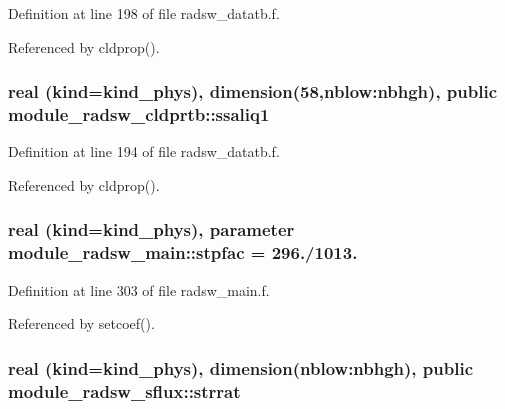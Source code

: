 Definition at line 198 of file radsw\+\_\+datatb.\+f.



Referenced by cldprop().

\subsubsection[{\texorpdfstring{ssaliq1}{ssaliq1}}]{\setlength{\rightskip}{0pt plus 5cm}real (kind=kind\+\_\+phys), dimension(58,nblow\+:nbhgh), public module\+\_\+radsw\+\_\+cldprtb\+::ssaliq1}\hypertarget{group__module__radsw__main_ga7944084ba9f240723dc93467ec66f825}{}\label{group__module__radsw__main_ga7944084ba9f240723dc93467ec66f825}


Definition at line 194 of file radsw\+\_\+datatb.\+f.



Referenced by cldprop().

\subsubsection[{\texorpdfstring{stpfac}{stpfac}}]{\setlength{\rightskip}{0pt plus 5cm}real (kind=kind\+\_\+phys), parameter module\+\_\+radsw\+\_\+main\+::stpfac = 296./1013.\hspace{0.3cm}{\ttfamily [private]}}\hypertarget{group__module__radsw__main_ga4d32ea8f0f1bca37e3351a5ae5077f77}{}\label{group__module__radsw__main_ga4d32ea8f0f1bca37e3351a5ae5077f77}


Definition at line 303 of file radsw\+\_\+main.\+f.



Referenced by setcoef().

\subsubsection[{\texorpdfstring{strrat}{strrat}}]{\setlength{\rightskip}{0pt plus 5cm}real (kind=kind\+\_\+phys), dimension(nblow\+:nbhgh), public module\+\_\+radsw\+\_\+sflux\+::strrat}\hypertarget{group__module__radsw__main_gaee2a2275da028b0960c5c1c8a34f46cf}{}\label{group__module__radsw__main_gaee2a2275da028b0960c5c1c8a34f46cf}


